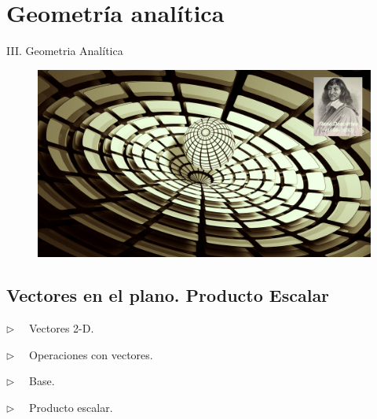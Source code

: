 \part{Geometría analítica}

\null\vfill
\begin{Huge}\begin{center}
III. Geometria Analítica	
\end{center}\end{Huge}

\vspace{1.5cm}

\begin{figure}[H]
	\centering
	\includegraphics[width=.9\textwidth]{imagenes/part3.png}	
\end{figure}
\par
\vfill

\chapter{Vectores en el plano. Producto Escalar}
	
	
	
\vspace{15mm}


\begin{adjustwidth}{40pt}{40pt}
\begin{cuadro-gris}

	\begin{multicols}{2}
	$\triangleright \quad$  Vectores 2-D.
	
	$\triangleright \quad$  Operaciones con vectores.
	
	$\triangleright \quad$  Base.
	
	$\triangleright \quad$  Producto escalar.
	\end{multicols}
	
\end{cuadro-gris}
\end{adjustwidth}



